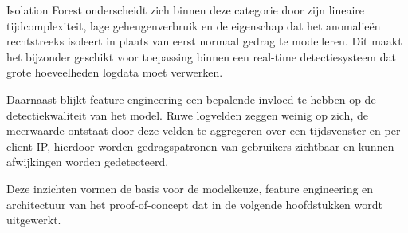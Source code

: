 Isolation Forest onderscheidt zich binnen deze categorie door zijn lineaire tijdcomplexiteit, lage geheugenverbruik en de eigenschap dat het anomalieën rechtstreeks isoleert in plaats van eerst normaal gedrag te modelleren. Dit maakt het bijzonder geschikt voor toepassing binnen een real-time detectiesysteem dat grote hoeveelheden logdata moet verwerken.

Daarnaast blijkt feature engineering een bepalende invloed te hebben op de detectiekwaliteit van het model. Ruwe logvelden zeggen weinig op zich, de meerwaarde ontstaat door deze velden te aggregeren over een tijdsvenster en per client-IP, hierdoor worden gedragspatronen van gebruikers zichtbaar en kunnen afwijkingen worden gedetecteerd. 

Deze inzichten vormen de basis voor de modelkeuze, feature engineering en architectuur van het proof-of-concept dat in de volgende hoofdstukken wordt uitgewerkt.



